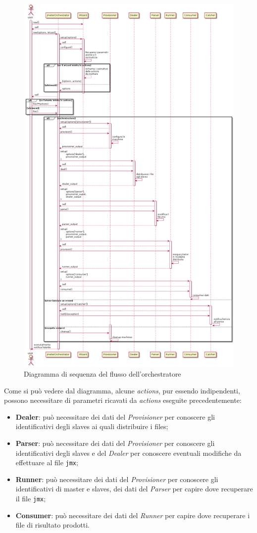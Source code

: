 \begin{figure}[H]
	\centering
	\includegraphics[width=13cm]{immagini/coresequence}
	\caption{Diagramma di sequenza del flusso dell'orchestratore}
	\label{img-core-seqeunce}
\end{figure}
Come si può vedere dal diagramma, alcune \textit{actions}, pur essendo indipendenti, possono necessitare di parametri ricavati da \textit{actions} eseguite precedentemente:
\begin{itemize}
	\item \textbf{Dealer}: può necessitare dei dati del \textit{Provisioner} per conoscere gli identificativi degli slaves ai quali distribuire i files;
	\item \textbf{Parser}: può necessitare dei dati del \textit{Provisioner} per conoscere gli identificativi degli slaves e del \textit{Dealer} per conoscere eventuali modifiche da effettuare al file \texttt{jmx};
	\item \textbf{Runner}: può necessitare dei dati del \textit{Provisioner} per conoscere gli identificativi di master e slaves, dei dati del \textit{Parser} per capire dove recuperare il file \texttt{jmx};
	\item \textbf{Consumer}: può necessitare dei dati del \textit{Runner} per capire dove recuperare i file di risultato prodotti.
\end{itemize}
